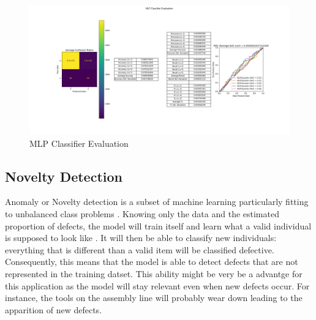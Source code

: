 \begin{figure}
    \centering
    \includegraphics[scale=0.32]{img/mlp_d.png}
    \caption{MLP Classifier Evaluation}
    \label{mlp_d}
\end{figure}

\subsection{Novelty Detection}
Anomaly or Novelty detection is a subset of machine learning particularly
fitting to unbalanced class problems \cite{novel_scikit}. Knowing only the data
and the estimated proportion of defects, the model will train itself and learn
what a valid individual is supposed to look like \cite{novel_yt}. It will then
be able to classify new individuals: everything that is different than a valid
item will be classified defective. Consequently, this means that the model is
able to detect defects that are not represented in the training datset. This
ability might be very be a advantge for this application as the model will stay
relevant even when new defects occur. For instance, the tools on the assembly
line will probably wear down leading to the apparition of new defects.